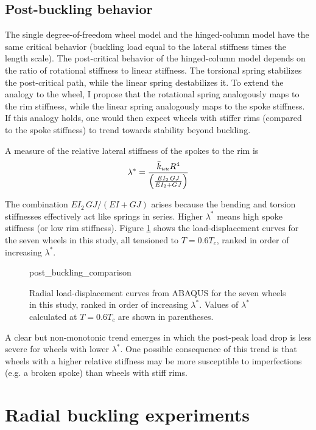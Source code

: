 \documentclass[\rootdir/thesis.tex]{subfiles}
\begin{document}
\subsection{Post-buckling behavior}

The single degree-of-freedom wheel model and the hinged-column model have the same critical behavior (buckling load equal to the lateral stiffness times the length scale). The post-critical behavior of the hinged-column model depends on the ratio of rotational stiffness to linear stiffness. The torsional spring stabilizes the post-critical path, while the linear spring destabilizes it. To extend the analogy to the wheel, I propose that the rotational spring analogously maps to the rim stiffness, while the linear spring analogously maps to the spoke stiffness. If this analogy holds, one would then expect wheels with stiffer rims (compared to the spoke stiffness) to trend towards stability beyond buckling.

A measure of the relative lateral stiffness of the spokes to the rim is
\begin{equation}
\lambda^* = \frac{\bar{k}_{uu} R^4}{\left(\frac{EI_2\,GJ}{EI_2+GJ}\right)}
\end{equation}

The combination $EI_2\,GJ/(EI+GJ)$ arises because the bending and torsion stiffnesses effectively act like springs in series. Higher $\lambda^*$ means high spoke stiffness (or low rim stiffness). Figure \ref{fig:post_buckling_comparison} shows the load-displacement curves for the seven wheels in this study, all tensioned to $T=0.6T_c$, ranked in order of increasing $\lambda^*$.

\begin{figure}[h]
\centering
{post_buckling_comparison}
\caption{Radial load-displacement curves from ABAQUS for the seven wheels in this study, ranked in order of increasing $\lambda^*$. Values of $\lambda^*$ calculated at $T=0.6T_c$ are shown in parentheses.}
\label{fig:post_buckling_comparison}
\end{figure}

A clear but non-monotonic trend emerges in which the post-peak load drop is less severe for wheels with lower $\lambda^*$. One possible consequence of this trend is that wheels with a higher relative stiffness may be more susceptible to imperfections (e.g. a broken spoke) than wheels with stiff rims.


\section{Radial buckling experiments}
\end{document}
